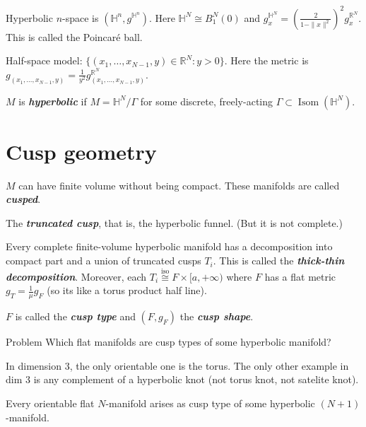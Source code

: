 Hyperbolic $n$-space is $(\mathbb{H}^n,g^{\mathbb{H}^n})$. Here $\mathbb{H}^N\cong B_1^N(0)$ and $g^{\mathbb{H}^N}_x=\left( \frac{2}{1-\|x\|^2} \right)^2 g^{\mathbb{R}^N}_x$. This is called the Poincaré ball.

Half-space model: $\{(x_1,\ldots,x_{N-1},y) \in \mathbb{R}^N:y>0\}$. Here the metric is $g_{(x_1,\ldots,x_{N-1},y)}=\frac{1}{y^2}g^{\mathbb{R}^N}_(x_1,\ldots,x_{N-1},y)$.

$M$ is \textit{\textbf{hyperbolic}} if  $M=\mathbb{H}^N/\Gamma$ for some discrete, freely-acting $\Gamma \subset \operatorname{Isom}(\mathbb{H}^N)$.

\section{Cusp geometry}

\begin{remark}\leavevmode
	$M$ can have finite volume without being compact. These manifolds are called \textit{\textbf{cusped}}.
\end{remark}

\begin{example}\leavevmode
	The \textit{\textbf{truncated cusp}}, that is, the hyperbolic funnel. (But it is not complete.)
\end{example}

\begin{prop}\leavevmode
	Every complete finite-volume hyperbolic manifold has a decomposition into compact part and a union of truncated cusps $T_i$. This is called the \textit{\textbf{thick-thin decomposition}}. Moreover, each $T_i\overset{\operatorname{is o}}{\cong}F \times [a, +\infty)$ where $F$ has a flat metric $g_T=\frac{1}{\mu}g_F$ (so its like a torus product half line).

	$F$ is called the \textit{\textbf{cusp type}} and $(F,g_F)$ the  \textit{\textbf{cusp shape}}.
\end{prop}


\begin{thing4}{Problem}\leavevmode
	Which flat manifolds are cusp types of some hyperbolic manifold?
\end{thing4}

In dimension 3, the only orientable one is the torus. The only other example in dim 3 is any complement of a hyperbolic knot (not torus knot, not satelite knot).

\begin{thm}[M C Reynolds, '09]\leavevmode
Every orientable flat $N$-manifold arises as cusp type of some hyperbolic $(N+1)$-manifold.
\end{thm}

